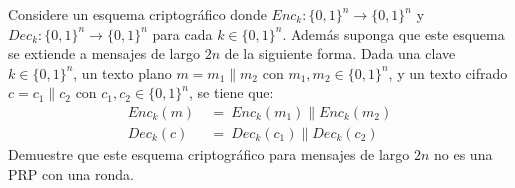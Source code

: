 Considere un esquema criptográfico donde $\textit{Enc}_k : \{0,1\}^n \to \{0,1\}^n$ y $\textit{Dec}_k :\{0,1\}^n \to \{0,1\}^n$ para cada $k \in \{0,1\}^n$. Además suponga que este esquema se extiende a mensajes de largo $2n$ de la siguiente forma. Dada una clave $k \in \{0,1\}^n$, un texto plano $m = m_1 \| m_2$ con $m_1, m_2 \in \{0,1\}^n$, y un texto cifrado $c = c_1 \| c_2$ con $c_1, c_2 \in \{0,1\}^n$, se tiene que:
\begin{align*}
\textit{Enc}_k(m) \ &= \ \textit{Enc}_k(m_1) \| \textit{Enc}_k(m_2)\\
\textit{Dec}_k(c) \ &= \ \textit{Dec}_k(c_1) \| \textit{Dec}_k(c_2)
\end{align*}
Demuestre que este esquema criptográfico para mensajes de largo $2n$ no es una PRP con una ronda.
